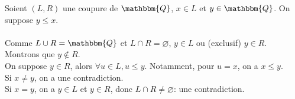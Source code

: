 \documentclass[a4paper]{report}
\let\emptyset\varnothing
\let\le\leqslant
\newcommand{\Q}{\mathbbm{Q}}
\renewcommand{\O}{\emptyset}
\begin{document}
	\begin{section}{}
		Soient $\left( L, R \right)$ une coupure de $\Q$, $x\in L$ et $y \in \Q$. On suppose $y \le x$.\\
		\\
		Comme $L\cup R = \Q$ et $L \cap R =  \O$, $y \in L$ ou (exclusif) $y \in R$. \\Montrons que $y \not\in R$.\\
		On suppose $y \in R$, alors $\forall u \in L, u \le y$. Notamment, pour $u = x$, on a  $x \le y$.\\
		Si $x \neq y$, on a une contradiction.\\
		Si $x = y$, on a $y \in L$ et $y \in R$, donc $L \cap R \neq \O$: une contradiction.
		\\\vspace{2mm}\\
	\end{section}
\end{document}
